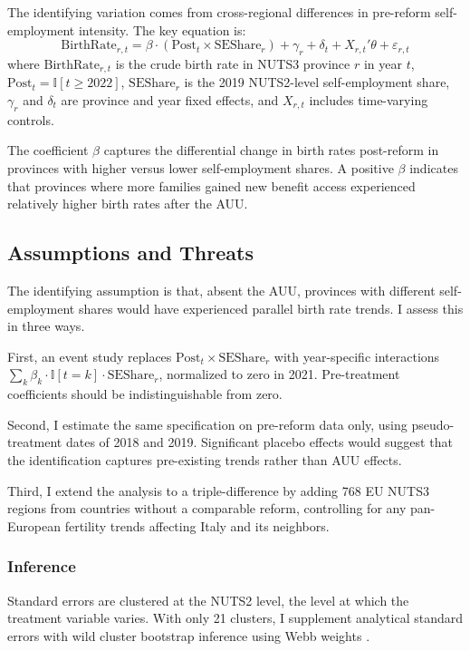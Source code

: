 \documentclass[12pt]{article}
\newcommand{\ind}{\mathbb{I}}
\begin{document}
The identifying variation comes from cross-regional differences in pre-reform self-employment intensity. The key equation is:
\begin{equation}
\text{BirthRate}_{r,t} = \beta \cdot (\text{Post}_{t} \times \text{SEShare}_{r}) + \gamma_r + \delta_t + X_{r,t}'\theta + \varepsilon_{r,t}
\label{eq:dd}
\end{equation}
where $\text{BirthRate}_{r,t}$ is the crude birth rate in NUTS3 province $r$ in year $t$, $\text{Post}_{t} = \ind[t \geq 2022]$, $\text{SEShare}_{r}$ is the 2019 NUTS2-level self-employment share, $\gamma_r$ and $\delta_t$ are province and year fixed effects, and $X_{r,t}$ includes time-varying controls.

The coefficient $\beta$ captures the differential change in birth rates post-reform in provinces with higher versus lower self-employment shares. A positive $\beta$ indicates that provinces where more families gained new benefit access experienced relatively higher birth rates after the AUU.

\subsection{Assumptions and Threats}

The identifying assumption is that, absent the AUU, provinces with different self-employment shares would have experienced parallel birth rate trends. I assess this in three ways.

First, an event study replaces $\text{Post}_t \times \text{SEShare}_r$ with year-specific interactions $\sum_{k} \beta_k \cdot \ind[t = k] \cdot \text{SEShare}_r$, normalized to zero in 2021. Pre-treatment coefficients should be indistinguishable from zero.

Second, I estimate the same specification on pre-reform data only, using pseudo-treatment dates of 2018 and 2019. Significant placebo effects would suggest that the identification captures pre-existing trends rather than AUU effects.

Third, I extend the analysis to a triple-difference by adding 768 EU NUTS3 regions from countries without a comparable reform, controlling for any pan-European fertility trends affecting Italy and its neighbors.

\subsubsection*{Inference} Standard errors are clustered at the NUTS2 level, the level at which the treatment variable varies. With only 21 clusters, I supplement analytical standard errors with wild cluster bootstrap inference using Webb weights \citep{cameron2008bootstrap, webb2014reworking}.
\end{document}
